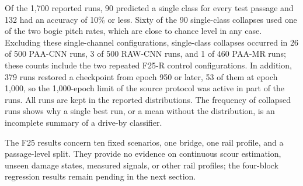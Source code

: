 Of the 1,700 reported runs, 90 predicted a single class for every test passage
and 132 had an accuracy of 10\% or less. Sixty of the 90 single-class
collapses used one of the two bogie pitch rates, which are close to chance
level in any case. Excluding these single-channel configurations, single-class
collapses occurred in
26 of 500 PAA-CNN runs, 3 of 500 RAW-CNN runs, and 1 of 460 PAA-MR runs; these
counts include the two repeated F25-R control configurations. In addition, 379
runs restored a checkpoint from epoch 950 or later, 53 of them at epoch 1,000,
so the 1,000-epoch limit of the source protocol was active in part of the
runs. All runs are kept in the reported distributions. The frequency of
collapsed runs shows why a single best run, or a mean without the
distribution, is an incomplete summary of a drive-by classifier.

The F25 results concern ten fixed scenarios, one bridge, one rail profile, and
a passage-level split. They provide no evidence on continuous scour
estimation, unseen damage states, measured signals, or other rail profiles;
the four-block regression results remain pending in the next section.
